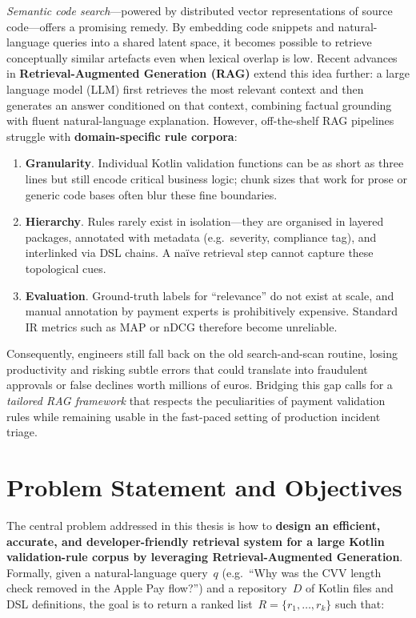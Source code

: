 \emph{Semantic code search}—powered by distributed vector representations of source code—offers a promising remedy.  
By embedding code snippets and natural-language queries into a shared latent space, it becomes possible to retrieve conceptually similar artefacts even when lexical overlap is low.  
Recent advances in \textbf{Retrieval-Augmented Generation (RAG)} extend this idea further: a large language model (LLM) first retrieves the most relevant context and then generates an answer conditioned on that context, combining factual grounding with fluent natural-language explanation.  
However, off-the-shelf RAG pipelines struggle with \textbf{domain-specific rule corpora}:

\begin{enumerate}
    \item \textbf{Granularity}. Individual Kotlin validation functions can be as short as three lines but still encode critical business logic; chunk sizes that work for prose or generic code bases often blur these fine boundaries.
    \item \textbf{Hierarchy}. Rules rarely exist in isolation—they are organised in layered packages, annotated with metadata (e.g.\ severity, compliance tag), and interlinked via DSL chains. A naïve retrieval step cannot capture these topological cues.
    \item \textbf{Evaluation}. Ground-truth labels for “relevance” do not exist at scale, and manual annotation by payment experts is prohibitively expensive. Standard IR metrics such as MAP or nDCG therefore become unreliable.
\end{enumerate}

Consequently, engineers still fall back on the old search-and-scan routine, losing productivity and risking subtle errors that could translate into fraudulent approvals or false declines worth millions of euros.  
Bridging this gap calls for a \emph{tailored RAG framework} that respects the peculiarities of payment validation rules while remaining usable in the fast-paced setting of production incident triage.

\section{Problem Statement and Objectives}
\label{sec:problem-statement}

The central problem addressed in this thesis is how to \textbf{design an efficient, accurate, and developer-friendly retrieval system for a large Kotlin validation-rule corpus by leveraging Retrieval-Augmented Generation}.  
Formally, given a natural-language query~$q$ (e.g.\ “Why was the CVV length check removed in the Apple Pay flow?”) and a repository~$D$ of Kotlin files and DSL definitions, the goal is to return a ranked list~$R = \{r_1, \dots, r_k\}$ such that:

